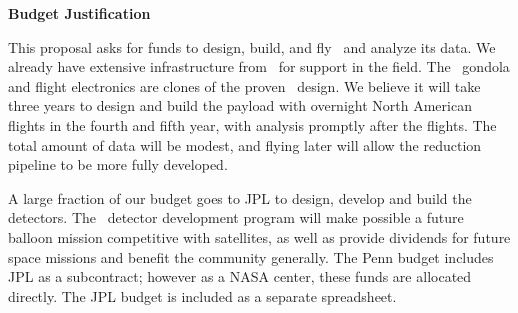 \begin{center}
{\bf \large Budget Justification}
\end{center}

This proposal asks for funds to design, build, and fly \name\ and
analyze its data.  
We already have extensive infrastructure from \blast\ for support in the field.  The \name\ gondola and flight electronics are clones of the proven \blast\ design.  We believe it will take three years to design and build the payload
with overnight North American flights in the fourth and fifth year, with analysis promptly after the flights.  The total amount of data will be modest, and flying later will allow the reduction pipeline to be more fully developed.

A large fraction of our budget goes to JPL to design, develop and
build the detectors.  The \name\ detector development program will make possible a future balloon mission competitive with satellites, as well as  
provide dividends for future space missions and benefit the
community generally.  The Penn budget includes JPL as a subcontract;
however as a NASA center, these funds are allocated directly.  The JPL
budget is included as a separate spreadsheet.



